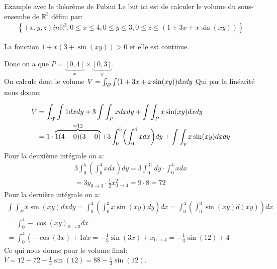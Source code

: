 \begin{parag}{Example avec le théorème de Fubini}
    Le but ici est de calculer le volume du sous-ensembe de  $\mathbb{R}^{3}$ défini par:
    \begin{align*} \left\{\left(x, y, z\right) in \mathbb{R}^{3}: 0 \leq x \leq 4, 0 \leq y \leq 3, 0 \leq z \leq \left( 1 + 3x + x\sin\left(xy\right)\right)\right\} \end{align*}
    \begin{framedremark}
        La fonction $1 + x\left(3 + \sin\left(xy\right)\right) > 0$ et elle est continue.
    \end{framedremark}
    Donc on a que $P =  \underbrace{\left[0, 4\right]}_{x} \times \underbrace{\left[0, 3\right]}_{y}$.\\
    On calcule dont le volume $V =  \int_\P\int \left(1 + 3x + x\sin\left(xy\right)\right)dxdy$ Qui par la linéarité nous donne:

    \begin{align*}  
        V &= \int_\P\int 1dxdy + 3\int\int_Pxdxdy + \int\int_Px\sin\left(xy\right)dxdy\\
          &= 1\cdot \overbrace{1\left(4-0\right)\left(3-0\right)}^{= 12} + 3 \int_0^5\left(\int_0^4 xdx\right)dy + \int\int_px\sin\left(xy\right)dxdy 
    \end{align*}
    Pour la deuxième intégrale on a:
    \begin{align*} 3\int_0^5\left(\int_0^4xdx\right)dy = 3\int_0^31dy\cdot \int_0^4xdx\\
    = 3y_{0 \to 3}\cdot \frac{1}{2}x^2_{0 \to 4} =  9 \cdot  8 =  72\end{align*}
    Pour la dernière intégrale on a:
    \begin{align*} \int\int_P x \sin\left(xy\right)dxdy =  \int_0^4\left(\int_0^3x\sin\left(xy\right)dy\right)dx =  \int_0^4\left(\int_0^3 \sin\left(xy\right)d\left(xy\right)\right)dx\\
    = \int_0^4 - \cos\left(xy\right)_{0 \to 3}dx\\
    = \int_0^4 \left(-\cos\left(3x\right) + 1 dx =  -\frac{1}{3}\sin\left(3x\right) + x_{0 \to 4} =  -\frac{1}{3}\sin\left(12\right) + 4
\end{align*}
Ce qui nous donne pour le volume final: $V =  12 + 72 - \frac{1}{3}\sin\left(12\right) =  88 - \frac{1}{3}\sin\left(12\right)$.
\end{parag}
